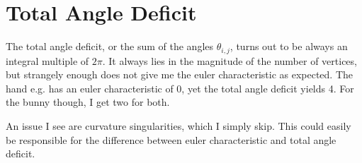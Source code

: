 \documentclass[a4paper,10pt,notitlepage]{scrreprt}
\begin{document}
\section{Total Angle Deficit}

The total angle deficit, or the sum of the angles $\theta_{i,j}$, turns out to
be always an integral multiple of $2 \pi$. It always lies in the magnitude of
the number of vertices, but strangely enough does not give me the euler
characteristic as expected. The hand e.g. has an euler characteristic of 0, yet
the total angle deficit yields 4. For the bunny though, I get two for both.

An issue I see are curvature singularities, which I simply skip. This could
easily be responsible for the difference between euler characteristic and total
angle deficit.

% 
\end{document}
